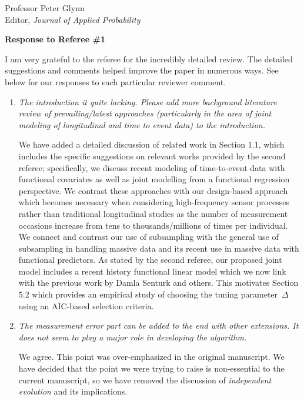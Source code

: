 \documentclass[11pt]{letter} %
\begin{document}
\begin{letter}{Professor
	Peter Glynn\\
	Editor, {\em Journal of Applied Probability}}
\begin{enumerate}
\end{enumerate}

\newpage
{\bf Response to Referee \#1}
\vspace{5mm}

I am very grateful to the referee for the incredibly detailed review.  The detailed suggestions and comments helped improve the paper in numerous ways.  See below for our responses to each particular reviewer comment.

\begin{enumerate}
\item {\it The introduction it quite lacking. Please add more background literature review of prevailing/latest approaches (particularly in the area of joint modeling of longitudinal and time to event data) to the introduction.}

\vspace{5mm}
We have added a detailed discussion of related work in Section 1.1, which includes the specific suggestions on relevant works provided by the second referee; specifically, we discuss recent modeling of time-to-event data with functional covariates as well as joint modelling from a functional regression perspective.  We contrast these approaches with our design-based approach which becomes necessary when considering high-frequency sensor processes rather than traditional longitudinal studies as the number of measurement occasions increase from tens to thousands/millions of times per individual.  We connect and contrast our use of subsampling with the general use of subsampling in handling massive data and its recent use in massive data with functional predictors.  As stated by the second referee, our proposed joint model includes a recent history functional linear model which we now link with the previous work by Damla Senturk and others.  This motivates Section 5.2 which provides an empirical study of choosing the tuning parameter~$\Delta$ using an AIC-based selection criteria.
\vspace{5mm}

\item {\it The measurement error part can be added to the end with other extensions. It does not seem to play a major role in developing the algorithm.}

\vspace{5mm}
We agree.  This point was over-emphasized in the original manuscript. We have decided that the point we were trying to raise is non-essential to the current manuscript, so we have removed the discussion of \emph{independent evolution} and its implications.
\vspace{5mm}


\end{enumerate}
\end{letter}
\end{document}
